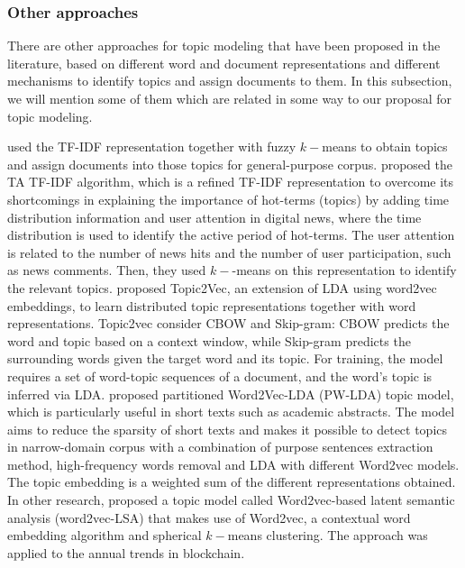 \documentclass{article}
\begin{document}
\subsubsection{Other approaches}

There are other approaches for topic modeling that have been proposed in the literature, based on different word and document representations and different mechanisms to identify topics and assign documents to them. In this subsection, we will mention some of them which are related in some way to our proposal for topic modeling.

\cite{Bafna2016} used the TF-IDF representation together with fuzzy $k-$means \citep{dunn73} to obtain topics and assign documents into those topics for general-purpose corpus. \cite{Zhu2019} proposed the TA TF-IDF algorithm, which is a refined TF-IDF representation to overcome its shortcomings in explaining the importance of hot-terms (topics) by adding time distribution information and user attention in digital news, where the time distribution is used to identify the active period of hot-terms. The user attention is related to the number of news hits and the number of user participation, such as news comments. Then, they  used $k-$-means on this representation to identify the relevant topics. \cite{Li-Qiang2015} proposed Topic2Vec, an extension of LDA using word2vec embeddings, to learn distributed topic representations together with word representations. Topic2vec consider CBOW and Skip-gram: CBOW predicts the word and topic  based on a context window, while Skip-gram predicts the surrounding words given the target word and its topic. For training, the model requires a set of word-topic sequences of a document, and the word's topic is inferred via LDA. \cite{Li2018} proposed partitioned Word2Vec-LDA (PW-LDA) topic model, which is particularly useful in short texts such as academic abstracts. The model aims to reduce the sparsity of short texts and makes it possible to detect topics in narrow-domain corpus with a combination of purpose sentences extraction method, high-frequency words removal and LDA with different Word2vec models. The topic embedding is a weighted sum of the different representations obtained. In other research, \cite{Kim2020} proposed a topic model called Word2vec-based latent semantic analysis (word2vec-LSA) that makes use of Word2vec, a contextual word embedding algorithm and spherical $k-$means clustering. The approach was applied to the annual trends in blockchain.
\end{document}
